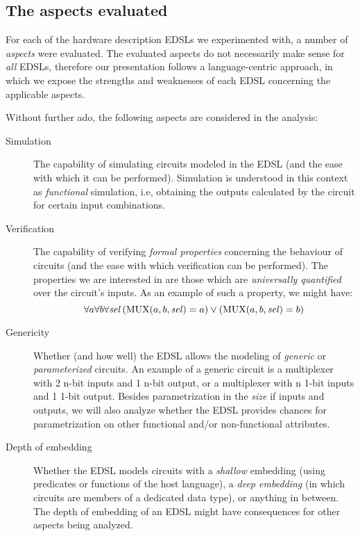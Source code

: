     \subsection{The aspects evaluated}
    \label{subsec:aspects}

        For each of the hardware description EDSLs we experimented with, a number of \emph{aspects}
        were evaluated. The evaluated aspects do not necessarily make sense for \emph{all} EDSLs,
        therefore our presentation follows a language-centric approach, in which we expose the
        strengths and weaknesses of each EDSL concerning the applicable aspects.

        Without further ado, the following aspects are considered in the analysis:

        \begin{description}
            \item[Simulation] The capability of simulating circuits modeled in the EDSL (and the
            ease with which it can be performed). Simulation is understood in this context as
            \emph{functional} simulation, i.e, obtaining the outputs calculated by the circuit for
            certain input combinations.

            \item[Verification] The capability of verifying \emph{formal properties} concerning the
            behaviour of circuits (and the ease with which verification can be performed). The
            properties we are interested in are those which are \emph{universally quantified} over
            the circuit's inputs. As an example of such a property, we might have: \[ \forall a
            \forall b \forall \text{\textit{sel}} \left( \text{MUX}(a,b,\text{\textit{sel}}) = a
            \right) \vee \left( \text{MUX}(a,b,\text{\textit{sel}}) = b \right) \]

            \item[Genericity] Whether (and how well) the EDSL allows the modeling of \emph{generic}
            or \emph{parameterized} circuits. An example of a generic circuit is a multiplexer with
            2 n-bit inputs and 1 n-bit output, or a multiplexer with n 1-bit inputs and 1 1-bit
            output. Besides parametrization in the \emph{size} if inputs and outputs, we will also
            analyze whether the EDSL provides chances for parametrization on other functional and/or
            non-functional attributes.

            \item[Depth of embedding] Whether the EDSL models circuits with a \emph{shallow}
            embedding (using predicates or functions of the host language), a \emph{deep embedding}
            (in which circuits are members of a dedicated data type), or anything in between. The
            depth of embedding of an EDSL might have consequences for other aspects being analyzed.


\end{description}
